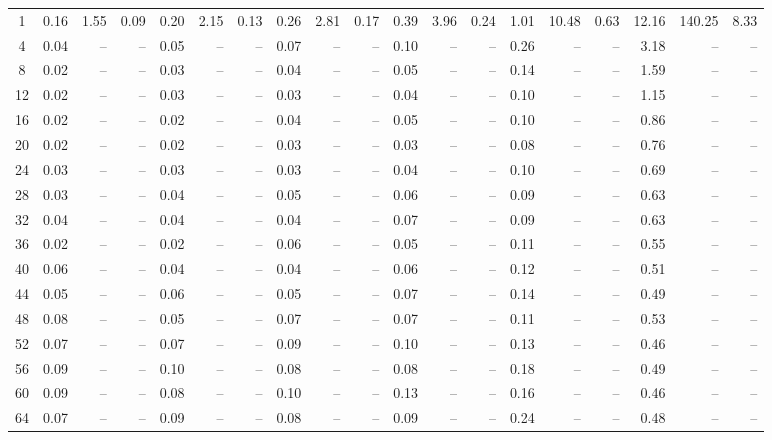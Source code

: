 \begin{table}[ht]
\begin{tabular}{crrrrrrrrrrrrrrrrrr}
1 & 0.16 & 1.55 & 0.09 & 0.20 & 2.15 & 0.13 & 0.26 & 2.81 & 0.17 & 0.39 & 3.96 & 0.24 & 1.01 & 10.48 & 0.63 & 12.16 & 140.25 & 8.33 \\
4 & 0.04 & -- & -- & 0.05 & -- & -- & 0.07 & -- & -- & 0.10 & -- & -- & 0.26 & -- & -- & 3.18 & -- & -- \\
8 & 0.02 & -- & -- & 0.03 & -- & -- & 0.04 & -- & -- & 0.05 & -- & -- & 0.14 & -- & -- & 1.59 & -- & -- \\
12 & 0.02 & -- & -- & 0.03 & -- & -- & 0.03 & -- & -- & 0.04 & -- & -- & 0.10 & -- & -- & 1.15 & -- & -- \\
16 & 0.02 & -- & -- & 0.02 & -- & -- & 0.04 & -- & -- & 0.05 & -- & -- & 0.10 & -- & -- & 0.86 & -- & -- \\
20 & 0.02 & -- & -- & 0.02 & -- & -- & 0.03 & -- & -- & 0.03 & -- & -- & 0.08 & -- & -- & 0.76 & -- & -- \\
24 & 0.03 & -- & -- & 0.03 & -- & -- & 0.03 & -- & -- & 0.04 & -- & -- & 0.10 & -- & -- & 0.69 & -- & -- \\
28 & 0.03 & -- & -- & 0.04 & -- & -- & 0.05 & -- & -- & 0.06 & -- & -- & 0.09 & -- & -- & 0.63 & -- & -- \\
32 & 0.04 & -- & -- & 0.04 & -- & -- & 0.04 & -- & -- & 0.07 & -- & -- & 0.09 & -- & -- & 0.63 & -- & -- \\
36 & 0.02 & -- & -- & 0.02 & -- & -- & 0.06 & -- & -- & 0.05 & -- & -- & 0.11 & -- & -- & 0.55 & -- & -- \\
40 & 0.06 & -- & -- & 0.04 & -- & -- & 0.04 & -- & -- & 0.06 & -- & -- & 0.12 & -- & -- & 0.51 & -- & -- \\
44 & 0.05 & -- & -- & 0.06 & -- & -- & 0.05 & -- & -- & 0.07 & -- & -- & 0.14 & -- & -- & 0.49 & -- & -- \\
48 & 0.08 & -- & -- & 0.05 & -- & -- & 0.07 & -- & -- & 0.07 & -- & -- & 0.11 & -- & -- & 0.53 & -- & -- \\
52 & 0.07 & -- & -- & 0.07 & -- & -- & 0.09 & -- & -- & 0.10 & -- & -- & 0.13 & -- & -- & 0.46 & -- & -- \\
56 & 0.09 & -- & -- & 0.10 & -- & -- & 0.08 & -- & -- & 0.08 & -- & -- & 0.18 & -- & -- & 0.49 & -- & -- \\
60 & 0.09 & -- & -- & 0.08 & -- & -- & 0.10 & -- & -- & 0.13 & -- & -- & 0.16 & -- & -- & 0.46 & -- & -- \\
64 & 0.07 & -- & -- & 0.09 & -- & -- & 0.08 & -- & -- & 0.09 & -- & -- & 0.24 & -- & -- & 0.48 & -- & -- \\
\hline
 \hline
\end{tabular}

\end{table}
